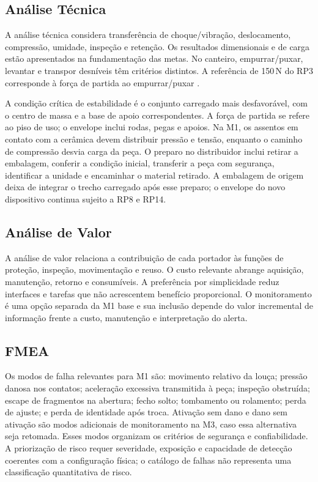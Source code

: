 \subsection{Análise Técnica}

A análise técnica considera transferência de choque/vibração, deslocamento, compressão, umidade, inspeção e retenção. Os resultados dimensionais e de carga estão apresentados na fundamentação das metas. No canteiro, empurrar/puxar, levantar e transpor desníveis têm critérios distintos. A referência de 150\,N do RP3 corresponde à força de partida ao empurrar/puxar \citep{hsepushpull}.

A condição crítica de estabilidade é o conjunto carregado mais desfavorável, com o centro de massa e a base de apoio correspondentes. A força de partida se refere ao piso de uso; o envelope inclui rodas, pegas e apoios. Na M1, os assentos em contato com a cerâmica devem distribuir pressão e tensão, enquanto o caminho de compressão desvia carga da peça. O preparo no distribuidor inclui retirar a embalagem, conferir a condição inicial, transferir a peça com segurança, identificar a unidade e encaminhar o material retirado. A embalagem de origem deixa de integrar o trecho carregado após esse preparo; o envelope do novo dispositivo continua sujeito a RP8 e RP14.

\subsection{Análise de Valor}

A análise de valor relaciona a contribuição de cada portador às funções de proteção, inspeção, movimentação e reuso. O custo relevante abrange aquisição, manutenção, retorno e consumíveis. A preferência por simplicidade reduz interfaces e tarefas que não acrescentem benefício proporcional. O monitoramento é uma opção separada da M1 base e sua inclusão depende do valor incremental de informação frente a custo, manutenção e interpretação do alerta.

\subsection{FMEA}

Os modos de falha relevantes para M1 são: movimento relativo da louça; pressão danosa nos contatos; aceleração excessiva transmitida à peça; inspeção obstruída; escape de fragmentos na abertura; fecho solto; tombamento ou rolamento; perda de ajuste; e perda de identidade após troca. Ativação sem dano e dano sem ativação são modos adicionais de monitoramento na M3, caso essa alternativa seja retomada. Esses modos organizam os critérios de segurança e confiabilidade. A priorização de risco requer severidade, exposição e capacidade de detecção coerentes com a configuração física; o catálogo de falhas não representa uma classificação quantitativa de risco.

